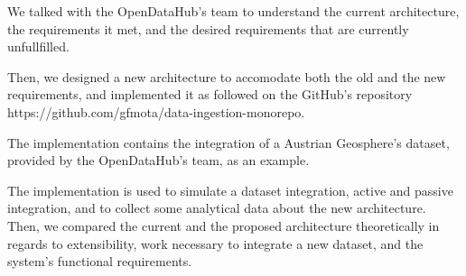 We talked with the OpenDataHub's team to understand the current architecture, the requirements it met, and the desired requirements that are currently unfullfilled. 

Then, we designed a new architecture to accomodate both the old and the new requirements, and implemented it as followed on the GitHub's repository https://github.com/gfmota/data-ingestion-monorepo.

The implementation contains the integration of a Austrian Geosphere's dataset, provided by the OpenDataHub's team, as an example.

The implementation is used to simulate a dataset integration, active and passive integration, and to collect some analytical data about the new architecture. Then, we compared the current and the proposed architecture theoretically in regards to extensibility, work necessary to integrate a new dataset, and the system's functional requirements.
